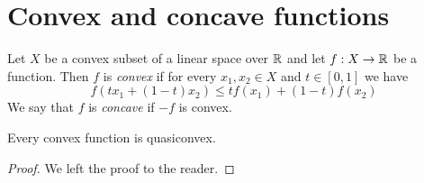 \section{Convex and concave functions}

\begin{definition}
Let $X$ be a convex subset of a linear space over ${\mathbb R}$ and let $f:X \rightarrow {\mathbb R}$ be a function. Then $f$ is \textit{convex} if for every $x_1, x_2\in X$ and $t\in [0,1]$ we have
$$f\left(tx_1 + (1-t)x_2\right)\leq tf(x_1) + (1-t)f(x_2)$$
We say that $f$ is \textit{concave} if $-f$ is convex.
\end{definition}

\begin{fact}\label{fact:conveximpliesquasiconvex}
Every convex function is quasiconvex.
\end{fact}
\begin{proof}
We left the proof to the reader.
\end{proof}














